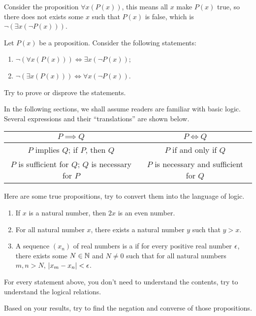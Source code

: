 \documentclass[10pt]{article}
\begin{document}
\par
Consider the proposition $\forall x(P(x))$, this means all $x$ make $P(x)$ true, so there does not exists some $x$ such that $P(x)$ is false, which is $\neg(\exists x(\neg P(x)))$. 
\begin{example}
    Let $P(x)$ be a proposition. Consider the following statements:
    \begin{enumerate}
        \item $\neg(\forall x(P(x)))\iff\exists x(\neg P(x))$;
        \item $\neg(\exists x(P(x)))\iff\forall x(\neg P(x))$.
    \end{enumerate}
    Try to prove or disprove the statements.
\end{example}
\par
In the following sections, we shall assume readers are familiar with basic logic. Several expressions and their “translations” are shown below.
\begin{center}
    \begin{tabular}{c|c}
        $P\implies Q$ & $P\iff Q$ \\
        \hline
        $P$ implies $Q$; if $P$, then $Q$ & $P$ if and only if $Q$ \\
        $P$ is sufficient for $Q$; $Q$ is necessary for $P$ & $P$ is necessary and sufficient for $Q$
    \end{tabular}
\end{center}
\begin{example}
    Here are some true propositions, try to convert them into the language of logic.
    \begin{enumerate}
        \item If $x$ is a natural number, then $2x$ is an even number.
        \item For all natural number $x$, there exists a natural number $y$ such that $y>x$.
        \item A sequence $({x}_{n})$ of real numbers is a  if for every positive real number $\epsilon$, there exists some $N\in\mathbb{N}$ and $N\ne 0$ such that for all natural numbers $m,n>N$, $\lvert{{x}_{m}-{x}_{n}}\rvert<\epsilon$.
    \end{enumerate}
    For every statement above, you don't need to understand the contents, try to understand the logical relations.
\end{example}
\begin{example}
    Based on your results, try to find the negation and converse of those propositions.
\end{example}
\end{document}
